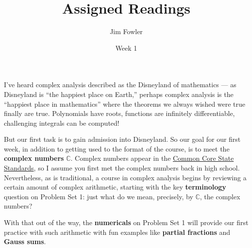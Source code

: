 \documentclass{homework}
\author{Jim Fowler}
\title{Assigned Readings}
\date{Week 1}
\begin{document}
\maketitle

I've heard complex analysis described as the Disneyland of mathematics
--- as Disneyland is ``the happiest place on Earth,'' perhaps complex
analysis is the ``happiest place in mathematics'' where the theorems
we always wished were true finally are true.  Polynomials have roots,
functions are infinitely differentiable, challenging integrals can be
computed!

But our first task is to gain admission into Disneyland.  So our goal
for our first week, in addition to getting used to the format of the
course, is to meet the \textbf{complex numbers} $\mathbb{C}$.  Complex
numbers appear in the
\href{http://www.corestandards.org/Math/Content/HSN/CN/}{Common Core
  State Standards}, so I assume you first met the complex numbers back
in high school.  Nevertheless, as is traditional, a course in complex
analysis begins by reviewing a certain amount of complex arithmetic,
starting with the key \textbf{terminology} question on Problem Set 1:
just what do we mean, precisely, by $\mathbb{C}$, the complex numbers?

With that out of the way, the \textbf{numericals} on Problem Set 1
will provide our first practice with such arithmetic with fun examples
like \textbf{partial fractions} and \textbf{Gauss sums}.
\end{document}
